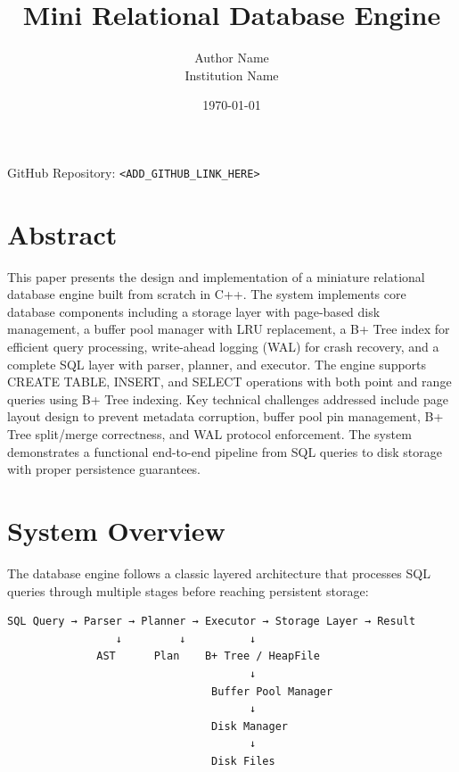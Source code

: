 \documentclass{article}
\title{Mini Relational Database Engine}
\author{Author Name \\ Institution Name}
\date{\today}
\begin{document}
\maketitle

\begin{center}
GitHub Repository: \texttt{<ADD\_GITHUB\_LINK\_HERE>}
\end{center}

\newpage

\section{Abstract}

This paper presents the design and implementation of a miniature relational database engine built from scratch in C++. The system implements core database components including a storage layer with page-based disk management, a buffer pool manager with LRU replacement, a B+ Tree index for efficient query processing, write-ahead logging (WAL) for crash recovery, and a complete SQL layer with parser, planner, and executor. The engine supports CREATE TABLE, INSERT, and SELECT operations with both point and range queries using B+ Tree indexing. Key technical challenges addressed include page layout design to prevent metadata corruption, buffer pool pin management, B+ Tree split/merge correctness, and WAL protocol enforcement. The system demonstrates a functional end-to-end pipeline from SQL queries to disk storage with proper persistence guarantees.

\section{System Overview}

The database engine follows a classic layered architecture that processes SQL queries through multiple stages before reaching persistent storage:

\begin{verbatim}
SQL Query → Parser → Planner → Executor → Storage Layer → Result
                 ↓         ↓          ↓
              AST      Plan    B+ Tree / HeapFile
                                      ↓
                                Buffer Pool Manager
                                      ↓
                                Disk Manager
                                      ↓
                                Disk Files
\end{verbatim}
\end{document}
